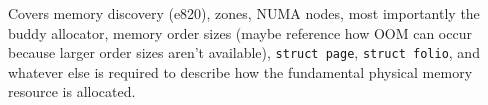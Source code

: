 Covers memory discovery (e820), zones, NUMA nodes, most importantly the buddy
allocator, memory order sizes (maybe reference how OOM can occur because larger
order sizes aren't available), \texttt{struct page},
\texttt{struct folio}, and whatever else is required to describe how the
fundamental physical memory resource is allocated.\\
